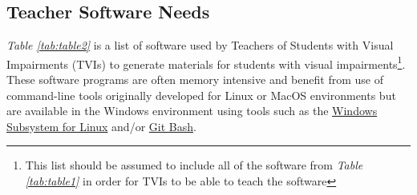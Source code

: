 \pagebreak \hypertarget{teacher-software-needs}{}\subsection{Teacher Software Needs}\label{teacher-software-needs}
\textit{Table \ref{tab:table2}} is a list of software used by Teachers of Students with Visual Impairments (TVIs) to generate materials for students with visual impairments\footnote{\raggedright This list should be assumed to include all of the software from \textit{Table \ref{tab:table1}} in order for TVIs to be able to teach the software}.
These software programs are often memory intensive and  benefit from use of command-line tools originally developed for Linux or MacOS environments but are available in the Windows environment using tools such as the \href{http://learn.Microsoft.com/en-us/windows/wsl/about}{Windows Subsystem for Linux} and/or \href{http://git-scm.com/download/win}{Git Bash}.


